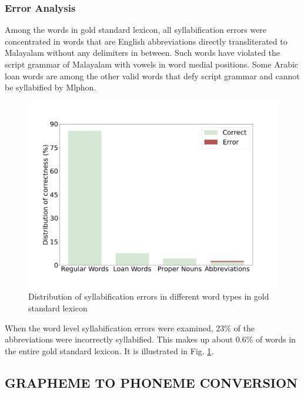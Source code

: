\documentclass{ieeeaccess}
\begin{document}
\subsubsection{Error Analysis}
\label{errorsyl}

Among the words in gold standard lexicon, all syllabification errors were concentrated in words that are English abbreviations directly transliterated to Malayalam without any delimiters in between. Such words have violated the script grammar of Malayalam with vowels in word medial positions. Some Arabic loan words are among the other valid words that defy script grammar and cannot be syllabified by Mlphon.

\begin{figure}[h]
    \centering
    \includegraphics[width=0.9\linewidth]{syllable-error.jpg}
    \caption{Distribution of syllabification errors in different word types in gold standard lexicon}
    \label{syllable-error}
\end{figure}


When the word level syllabification errors were examined, 23\% of the abbreviations were incorrectly syllabified. This makes up about 0.6\% of  words in the entire gold standard lexicon. It is illustrated in Fig. \ref{syllable-error}.


\subsection{GRAPHEME TO PHONEME CONVERSION}


\end{document}
